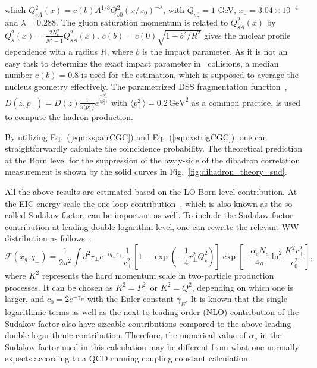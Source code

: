 which $Q^{2}_{sA}(x)=c(b)A^{1/3}Q^{2}_{s0}(x/x_{0})^{-\lambda}$, with $Q_{s0}=1$
GeV, $x_{0}=3.04\times 10^{-4}$ and  $\lambda=0.288$. The gluon saturation
momentum is related to $Q^{2}_{sA}(x)$ by
$Q_s^2(x)=\frac{2N_c^2}{N_c^2-1}Q^{2}_{sA}(x)$. $c(b)=c(0)\sqrt{1-b^{2}/R^{2}}$
gives the nuclear profile dependence with a radius $R$, where $b$ is the impact
parameter. As it is not an easy task to determine the exact impact parameter in \eA\
collisions, a median number $c(b)=0.8$ is used for the estimation,
which is supposed to average the nucleus geometry effectively. The parametrized
DSS fragmentation function~\cite{deFlorian:2007aj},
$D(z,p_{\perp})=D(z)\frac{1}{\pi\langle
p^{2}_{\perp}\rangle}e^{\frac{-p_{\perp}^{2}}{\langle p^{2}_{\perp}\rangle}}$ with
$\langle p^{2}_{\perp}\rangle=0.2 \, \mathrm{GeV}^{2}$ as a common practice, is used to compute the hadron
production.

By utilizing Eq.~(\ref{eqn:xspairCGC}) and Eq.~(\ref{eqn:xstrigCGC}), one can
straightforwardly calculate the coincidence probability. The theoretical
prediction at the Born level for the suppression of the away-side of the
dihadron correlation measurement is shown by the solid curves in
Fig.~\ref{fig:dihadron_theory_sud}.

All the above results are estimated based on the LO Born level
contribution. At the EIC energy scale the one-loop
contribution~\cite{Mueller:2012uf}, which is also known as the so-called Sudakov
factor, can be important as well. To include the Sudakov factor contribution at
leading double logarithm level, one can rewrite the relevant WW distribution as
follows~\cite{Mueller:2013wwa}:
\begin{equation}
\mathcal{F}(x_{g}, q_{\perp}) =
\frac{1}{2\pi^{2}} \int d^{2}r_{\perp} e^{-iq_{\perp}r_{\perp}}
\frac{1}{r^{2}_{\perp}}[1-\exp(-\frac{1}{4}r^{2}_{\perp}Q^{2}_{s})]
\exp[-\frac{\alpha_sN_c}{4\pi}\ln^2\frac{K^2r_{\perp}^2}{c^2_0}],
\label{eqn:Sudakov}
\end{equation}
where $K^2$ represents the hard momentum scale in two-particle production
processes. It can be chosen as $K^2=P^2_{\perp}$ or $K^2=Q^2$, depending on which
one is larger, and $c_0=2e^{-\gamma_E}$ with the Euler constant $\gamma_E$. It
is known that the single logarithmic terms as well as the next-to-leading order
(NLO) contribution of the Sudakov factor also have sizeable contributions 
compared to the above leading double logarithmic contribution. Therefore, the
numerical value of $\alpha_s$ in the Sudakov factor used in this calculation may
be different from what one normally expects according to a QCD running coupling
constant calculation.

